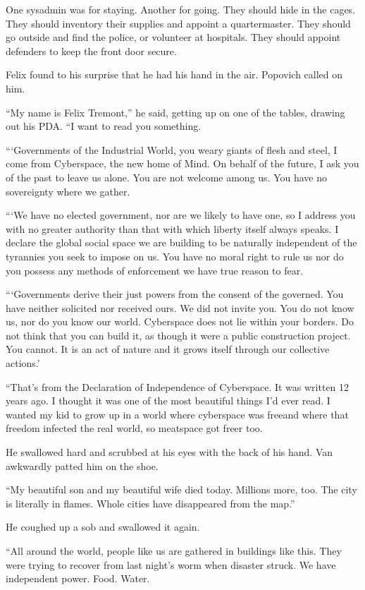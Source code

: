 One sysadmin was for staying. Another for going. They should hide
in the cages. They should inventory their supplies and appoint a
quartermaster. They should go outside and find the police, or
volunteer at hospitals. They should appoint defenders to keep the
front door secure.

Felix found to his surprise that he had his hand in the air.
Popovich called on him.

“My name is Felix Tremont,” he said, getting up on one of the
tables, drawing out his PDA. “I want to read you something.

“‘Governments of the Industrial World, you weary giants of flesh
and steel, I come from Cyberspace, the new home of Mind. On behalf
of the future, I ask you of the past to leave us alone. You are not
welcome among us. You have no sovereignty where we gather.

“‘We have no elected government, nor are we likely to have one, so
I address you with no greater authority than that with which
liberty itself always speaks. I declare the global social space we
are building to be naturally independent of the tyrannies you seek
to impose on us. You have no moral right to rule us nor do you
possess any methods of enforcement we have true reason to fear.

“‘Governments derive their just powers from the consent of the
governed. You have neither solicited nor received ours. We did not
invite you. You do not know us, nor do you know our world.
Cyberspace does not lie within your borders. Do not think that you
can build it, as though it were a public construction project. You
cannot. It is an act of nature and it grows itself through our
collective actions.’

“That’s from the Declaration of Independence of Cyberspace. It was
written 12 years ago. I thought it was one of the most beautiful
things I’d ever read. I wanted my kid to grow up in a world where
cyberspace was free\dash{}and where that freedom infected the real world,
so meatspace got freer too.

He swallowed hard and scrubbed at his eyes with the back of his
hand. Van awkwardly patted him on the shoe.

“My beautiful son and my beautiful wife died today. Millions more,
too. The city is literally in flames. Whole cities have disappeared
from the map.”

He coughed up a sob and swallowed it again.

“All around the world, people like us are gathered in buildings
like this. They were trying to recover from last night’s worm when
disaster struck. We have independent power. Food. Water.

